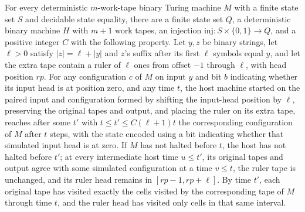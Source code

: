 \begin{theorem}
\label{Turing.exists_rulerHostTM}
\leanok
{}
For every deterministic $m$-work-tape binary Turing machine $M$ with a finite state set
$S$ and decidable state equality, there are a finite state set $Q$, a deterministic
binary machine $H$ with $m+1$ work tapes, an injection $\mathrm{inj}:S\times\{0,1\}\to
Q$, and a positive integer $C$ with the following property. Let $y,z$ be binary strings,
let $\ell>0$ satisfy $|z|=\ell+|y|$ and $z$'s suffix after its first $\ell$ symbols
equal $y$, and let the extra tape contain a ruler of $\ell$ ones from offset $-1$
through $\ell$, with head position $rp$. For any configuration $c$ of $M$ on input $y$
and bit $b$ indicating whether its input head is at position zero, and any time $t$, the
host machine started on the paired input and configuration formed by shifting the
input-head position by $\ell$, preserving the original tapes and output, and placing the
ruler on its extra tape, reaches after some $t'$ with $t\le t'\le C(\ell+1)t$ the
corresponding configuration of $M$ after $t$ steps, with the state encoded using a bit
indicating whether that simulated input head is at zero. If $M$ has not halted before
$t$, the host has not halted before $t'$; at every intermediate host time $u\le t'$, its
original tapes and output agree with some simulated configuration at a time $v\le t$,
the ruler tape is unchanged, and its ruler head remains in $[rp-1,rp+\ell]$. By time
$t'$, each original tape has visited exactly the cells visited by the corresponding tape
of $M$ through time $t$, and the ruler head has visited only cells in that same
interval.
\end{theorem}
